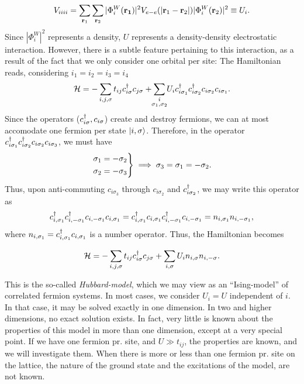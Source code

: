 \begin{equation}
	V_{iiii} = \sum_{\vb{r}_1}\sum_{\vb{r}_2}|\Phi_{i}^{W}(\vb{r_1})|^2V_{e-e}(|\vb{r}_1-\vb{r}_2|)|\Phi_{i}^{W}(\vb{r}_2)|^2 \equiv U_i.
\end{equation}
Since $ |\Phi_{i}^{W}|^2 $ represents a density, $U$ represents a density-density electrostatic interaction. However, there is a subtle feature pertaining to this interaction, as a result of the fact that we only consider one orbital per site: 
The Hamiltonian reads, considering $i_1 = i_2=i_3=i_4$
\begin{equation}
	\Ha = -\sum_{i,j,\sigma}t_{ij}\cd_{i\sigma}c_{j\sigma} + \sum_{\mathclap{\substack{i\\ \sigma_1, \sigma_2}}}U_i\cd_{i\sigma_1}\cd_{i\sigma_2}c_{i\sigma_2}c_{i\sigma_1}.
\end{equation}
Since the operators ($c^{\dagger}_{i\sigma},c_{i\sigma}$) create and destroy fermions, we can at most accomodate one fermion per state $\ket{i,\sigma}$. Therefore, in the operator $c^{\dagger}_{i\sigma_1}c^{\dagger}_{i\sigma_2}c_{i\sigma_2}c_{i\sigma_3}$, we must have
\begin{equation}
	\begin{rcases}
		\sigma_1 =-\sigma_2 \\
		\sigma_2 = -\sigma_3
	\end{rcases}
	\implies \sigma_3 = \sigma_1 = -\sigma_2.
\end{equation}
Thus, upon anti-commuting $c_{i\sigma_3}$ through $c_{i\sigma_2}$ and $c^{\dagger}_{i\sigma_2}$, we may write this operator as 
\begin{equation}
	c^{\dagger}_{i,\sigma_1}c^{\dagger}_{i,-\sigma_1}c_{i,-\sigma_1}c_{i,\sigma_1} = 	c^{\dagger}_{i,\sigma_1}c_{i,\sigma_1}c^{\dagger}_{i,-\sigma_1}c_{i,-\sigma_1} = n_{i,\sigma_1}n_{i,-\sigma_1},
\end{equation}
where $n_{i,\sigma_1} = c^{\dagger}_{i,\sigma_1}c_{i,\sigma_1}$ is a number operator. Thus, the Hamiltonian becomes
\begin{tcolorbox}
	\begin{equation}
		\mathcal{H} = - \sum_{i,j,\sigma}t_{ij}c^{\dagger}_{i\sigma}c_{j\sigma} + \sum_{i,\sigma}U_i n_{i,\sigma}n_{i,-\sigma}.
	\end{equation}
\end{tcolorbox}
This is the so-called \emph{Hubbard-model}, which we may view as an ``Ising-model'' of correlated fermion systems.
In most cases, we consider $U_i = U$ independent of $i$. In that case, it may be solved exactly in one dimension. In two and higher dimensions, no exact solution exists. In fact, very little is known about the properties of this model in more than one dimension, except at a very special point. If we have one fermion pr. site, and $U\gg t_{ij}$, the properties are known, and we will investigate them. When there is more or less than one fermion pr. site on the lattice, the nature of the ground state and the excitations of the model, are not known. 
